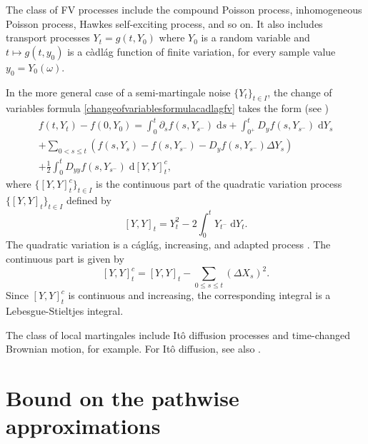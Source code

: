 \documentclass[reqno,12pt]{amsart}
\theoremstyle{plain} %
\theoremstyle{definition} %
\begin{document}
The class of FV processes include the compound Poisson process, inhomogeneous Poisson process, Hawkes self-exciting process, and so on. It also includes transport processes $Y_t = g(t, Y_0)$ where $Y_0$ is a random variable and $t \mapsto g(t, y_0)$ is a c\`adl\'ag function of finite variation, for every sample value $y_0=Y_0(\omega)$.

In the more general case of a semi-martingale noise $\{Y_t\}_{t\in I}$, the change of variables formula \eqref{changeofvariablesformulacadlagfv} takes the form (see \cite[Theorems II.32 and II.33]{Protter2005})
\begin{multline}
    \label{changeofvariablesformulasemimartingale}
    f(t, Y_t) - f(0, Y_0) = \int_0^t \partial_s f(s, Y_{s^-})\;\mathrm{d}s + \int_{0^+}^t D_y f(s, Y_{s^-}) \;\mathrm{d}Y_s \\
    + \sum_{0 < s \leq t} \left( f(s, Y_s) - f(s, Y_{s^{-}}) - D_y f(s, Y_{s^-})\Delta Y_s\right) \\
    + \frac{1}{2}\int_0^t D_{yy}f(s, Y_{s^-})\;\mathrm{d}[Y, Y]_t^c,
\end{multline}
where $\{[Y, Y]_t^c\}_{t\in I}$ is the continuous part of the quadratic variation process $\{[Y, Y]_t\}_{t\in I}$ defined by
\[
    [Y, Y]_t = Y_t^2 - 2\int_0^t Y_{t^-} \;\mathrm{d}Y_t.
\]
The quadratic variation is a c\'agl\'ag, increasing, and adapted process \cite[Theorem II.22]{Protter2005}. The continuous part is given by
\[
    [Y, Y]_t^c = [Y, Y]_t - \sum_{0\leq s \leq t} \left(\Delta X_s\right)^2.
\]
Since $[Y, Y]_t^c$ is continuous and increasing, the corresponding integral is a Lebesgue-Stieltjes integral.

The class of local martingales include It\^o diffusion processes and time-changed Brownian motion, for example. For It\^o diffusion, see also \cite{Oksendal2003}.

\section{Bound on the pathwise approximations}
\label{secpathwiseapproximation}
\end{document}
